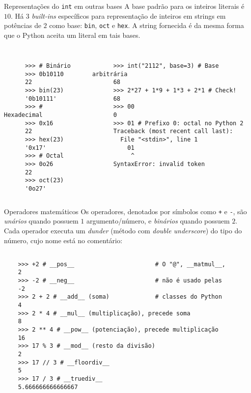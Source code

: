 \documentclass[utf8]{beamer}
\begin{document}
\begin{frame}[fragile]{Representações do \texttt{int} em outras bases}
  A base padrão para os inteiros literais é $10$.
  Há $3$ \emph{built-ins} específicos
  para representação de inteiros em strings
  em potências de $2$ como base:
  \texttt{bin},
  \texttt{oct} e
  \texttt{hex}.
  A string fornecida é da mesma forma que o Python aceita
  um literal em tais bases.

  \begin{columns}

    \begin{verbatim}

      >>> # Binário
      >>> 0b10110
      22
      >>> bin(23)
      '0b10111'
      >>> # Hexadecimal
      >>> 0x16
      22
      >>> hex(23)
      '0x17'
      >>> # Octal
      >>> 0o26
      22
      >>> oct(23)
      '0o27'

    \end{verbatim}

    \begin{verbatim}

      >>> int("2112", base=3) # Base arbitrária
      68
      >>> 2*27 + 1*9 + 1*3 + 2*1 # Check!
      68
      >>> 00
      0
      >>> 01 # Prefixo 0: octal no Python 2
      Traceback (most recent call last):
        File "<stdin>", line 1
          01
           ^
      SyntaxError: invalid token

    \end{verbatim}

  \end{columns}
\end{frame}


\begin{frame}[fragile]{Operadores matemáticos}
  Os operadores,
  denotados por símbolos como
  \texttt{+} e \texttt{-},
  são \emph{unários} quando possuem $1$ argumento/número,
  e \emph{binários} quando possuem $2$.
  Cada operador executa um \emph{dunder}
  (método com \emph{double underscore}) do tipo do número,
  cujo nome está no comentário:

  \begin{verbatim}

    >>> +2 # __pos__                       # O "@", __matmul__,
    2
    >>> -2 # __neg__                       # não é usado pelas
    -2
    >>> 2 + 2 # __add__ (soma)             # classes do Python
    4
    >>> 2 * 4 # __mul__ (multiplicação), precede soma
    8
    >>> 2 ** 4 # __pow__ (potenciação), precede multiplicação
    16
    >>> 17 % 3 # __mod__ (resto da divisão)
    2
    >>> 17 // 3 # __floordiv__
    5
    >>> 17 / 3 # __truediv__
    5.666666666666667

  \end{verbatim}

\end{frame}
\end{document}
